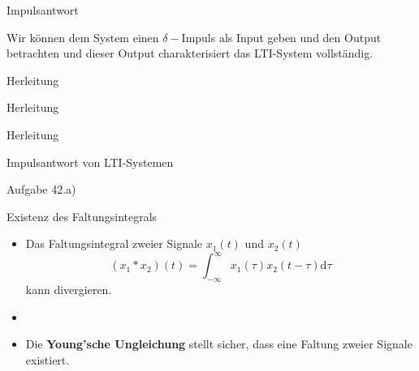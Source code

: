 \documentclass[14pt, aspectratio=169, handout]{beamer}
\begin{document}
\begin{frame}{Impulsantwort}

\vspace*{1cm}
Wir können dem System einen $\delta-$Impuls als Input geben und den Output betrachten und dieser Output charakterisiert das LTI-System vollständig.
\end{frame}

\begin{frame}{Herleitung}
    
\end{frame}

\begin{frame}{Herleitung}
    
\end{frame}

\begin{frame}{Herleitung}
    
\end{frame}

\begin{frame}{Impulsantwort von LTI-Systemen}
\end{frame}

\begin{frame}{Aufgabe 42.a)}
    
\end{frame}

\begin{frame}{Existenz des Faltungsintegrals}
    \begin{itemize}
        \item Das Faltungsintegral zweier Signale $x_1(t)$ und $x_2(t)$ $$(x_1 \ast x_2)(t) = \int_{-\infty}^{\infty} x_1(\tau)x_2(t-\tau) \text{d}\tau$$ kann divergieren.
        \item[] 
        \item Die \textbf{Young'sche Ungleichung} stellt sicher, dass eine Faltung zweier Signale existiert.
    \end{itemize}
\end{frame}
\end{document}
